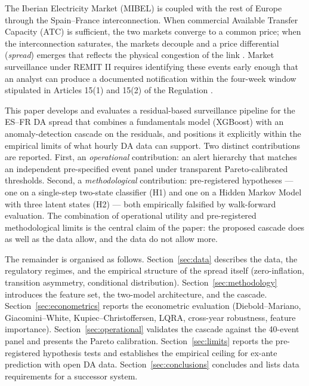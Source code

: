 \documentclass[11pt,a4paper]{article}
\begin{document}
The Iberian Electricity Market (MIBEL) is coupled with the rest of
Europe through the Spain--France interconnection. When commercial
Available Transfer Capacity (ATC) is sufficient, the two markets
converge to a common price; when the interconnection saturates, the
markets decouple and a price differential (\emph{spread}) emerges
that reflects the physical congestion of the link
\citep{Newbery2016}. Market surveillance under REMIT II requires
identifying these events early enough that an analyst can produce a
documented notification within the four-week window stipulated in
Articles 15(1) and 15(2) of the Regulation \citep{ACER2024}.

This paper develops and evaluates a residual-based surveillance
pipeline for the ES--FR DA spread that combines a fundamentals model
(XGBoost) with an anomaly-detection cascade on the residuals, and
positions it explicitly within the empirical limits of what
hourly DA data can support. Two distinct contributions are reported.
First, an \emph{operational} contribution: an alert hierarchy that
matches an independent pre-specified event panel under transparent
Pareto-calibrated thresholds. Second, a \emph{methodological}
contribution: pre-registered hypotheses --- one on a single-step
two-state classifier (H1) and one on a Hidden Markov Model with three
latent states (H2) --- both empirically falsified by walk-forward
evaluation. The combination of operational utility and pre-registered
methodological limits is the central claim of the paper: the
proposed cascade does as well as the data allow, and the data do not
allow more.

The remainder is organised as follows.
Section~\ref{sec:data} describes the data, the regulatory regimes,
and the empirical structure of the spread itself (zero-inflation,
transition asymmetry, conditional distribution).
Section~\ref{sec:methodology} introduces the feature set, the
two-model architecture, and the cascade.
Section~\ref{sec:econometrics} reports the econometric evaluation
(Diebold--Mariano, Giacomini--White, Kupiec--Christoffersen, LQRA,
cross-year robustness, feature importance).
Section~\ref{sec:operational} validates the cascade against the
40-event panel and presents the Pareto calibration.
Section~\ref{sec:limits} reports the pre-registered hypothesis tests
and establishes the empirical ceiling for ex-ante prediction with
open DA data.
Section~\ref{sec:conclusions} concludes and lists data requirements
for a successor system.

\end{document}
